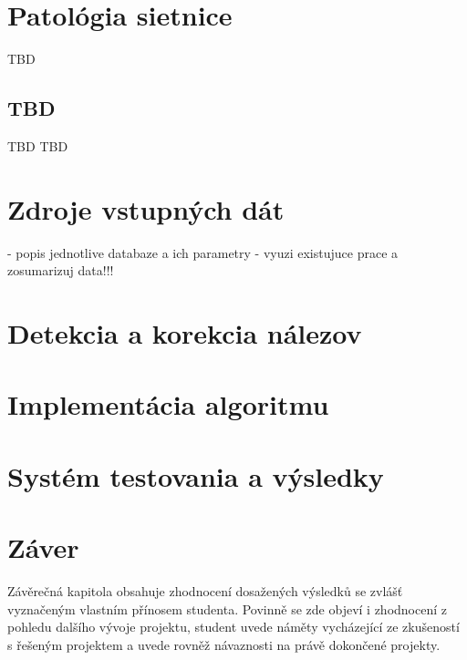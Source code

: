 \chapter{Patológia sietnice}\label{ch:kap2}
TBD\cite{prim}
\section{TBD}
TBD\cite{sec}
TBD\cite{bio}

\chapter{Zdroje vstupných dát}\label{ch:kap3}
- popis jednotlive databaze a ich parametry - vyuzi existujuce prace a zosumarizuj data!!!

\chapter{Detekcia a korekcia nálezov}\label{ch:kap4}

\chapter{Implementácia algoritmu}

\chapter{Systém testovania a výsledky}\label{ch:kap5}

\chapter{Záver}\label{ch:kap6}
Závěrečná kapitola obsahuje zhodnocení dosažených výsledků se zvlášť vyznačeným vlastním přínosem studenta. Povinně se zde objeví i zhodnocení z pohledu dalšího vývoje projektu, student uvede náměty vycházející ze zkušeností s řešeným projektem a uvede rovněž návaznosti na právě dokončené projekty.

